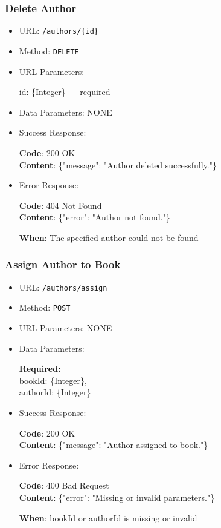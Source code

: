 \subsubsection*{Delete Author}

\begin{itemize}
    \item URL: \texttt{/authors/\{id\}}
    \item Method: \texttt{DELETE}
    \item URL Parameters:

    id: \{Integer\} — required

    \item Data Parameters: NONE

    \item Success Response: \newline

    \textbf{Code}: 200 OK \\
    \textbf{Content}: \{"message": "Author deleted successfully."\}

    \item Error Response: \newline

    \textbf{Code}: 404 Not Found \\
    \textbf{Content}: \{"error": "Author not found."\}

    \textbf{When}: The specified author could not be found
\end{itemize}

\subsubsection*{Assign Author to Book}

\begin{itemize}
    \item URL: \texttt{/authors/assign}
    \item Method: \texttt{POST}
    \item URL Parameters: NONE
    \item Data Parameters:

    \textbf{Required:} \\
    bookId: \{Integer\}, \\
    authorId: \{Integer\}

    \item Success Response: \newline

    \textbf{Code}: 200 OK \\
    \textbf{Content}: \{"message": "Author assigned to book."\}

    \item Error Response: \newline

    \textbf{Code}: 400 Bad Request \\
    \textbf{Content}: \{"error": "Missing or invalid parameters."\}

    \textbf{When}: bookId or authorId is missing or invalid
\end{itemize}

